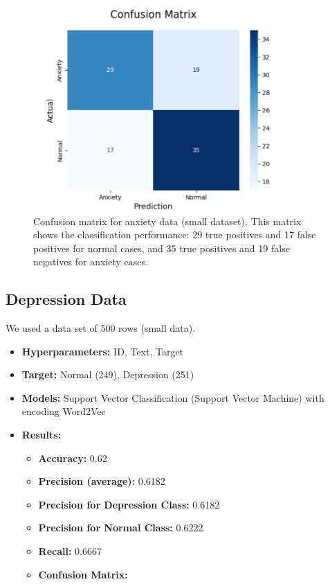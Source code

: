 \documentclass[runningheads,a4paper,11pt]{report}
\begin{document}
\begin{figure}[H]
\centering
\includegraphics[width=0.9\textwidth]{Anxiety-Data-SmallData.jpg}
\caption[Confusion matrix for anxiety data (small dataset)]{Confusion matrix for anxiety data (small dataset). This matrix shows the classification performance: 29 true positives and 17 false positives for normal cases, and 35 true positives and 19 false negatives for anxiety cases.}
\end{figure}


\vspace{0.5cm} %

\subsection{Depression Data}
\label{section:depression}
We used a data set of 500 rows (small data).
\begin{itemize}
    \item \textbf{Hyperparameters:} ID, Text, Target
    \item \textbf{Target:} Normal (249), Depression (251)
    \item \textbf{Models:} Support Vector Classification (Support Vector Machine) with encoding Word2Vec
    \item \textbf{Results:}
    \begin{itemize}
        \item \textbf{Accuracy:} 0.62
        \item \textbf{Precision (average):} 0.6182
        \item \textbf{Precision for Depression Class:} 0.6182
        \item \textbf{Precision for Normal Class:} 0.6222
        \item \textbf{Recall:} 0.6667
        \item \textbf{Confusion Matrix:}
    \end{itemize}
\end{itemize}
\end{document}
